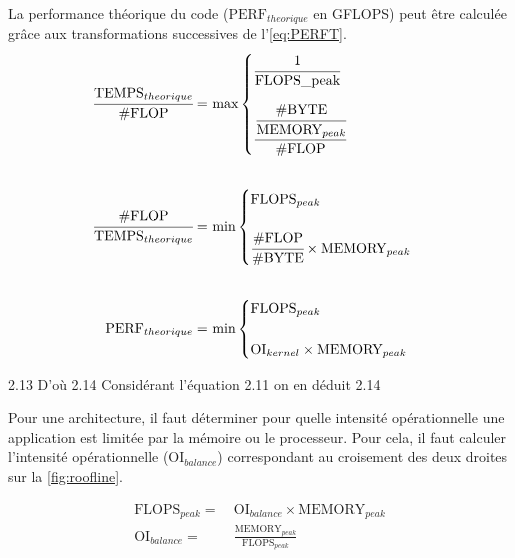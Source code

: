             
            
            
            La performance théorique du code ($\text{PERF}_{theorique}$ en GFLOPS) peut être calculée grâce aux transformations successives de l'\autoref{eq:PERFT}.
            \begin{equation}
            \begin{aligned}
            \label{eq:PERFT}
            \cfrac{\text{TEMPS}_{theorique}}{\text{\#FLOP}}  =\ &\text{max}
            \begin{cases} 
                \cfrac {1}{\text{FLOPS\_{peak}}}    \\[15pt]  
                \cfrac {\cfrac{\text{\#BYTE}}{\text{MEMORY}_{peak}}}{\text{\#FLOP}} 
            \end{cases}\\[20pt]
            \cfrac{\text{\#FLOP}}{\text{TEMPS}_{theorique}}  =\ &\text{min}
            \begin{cases} 
                \text{FLOPS}_{peak}    \\[15pt]  
                \cfrac{\text{\#FLOP}}{\text{\#BYTE}} \times \text{MEMORY}_{peak}
            \end{cases}\\[20pt]
            \text{PERF}_{theorique}  =\ &\text{min}
            \begin{cases} 
                \text{FLOPS}_{peak}    \\[15pt]  
                \text{OI}_{kernel} \times \text{MEMORY}_{peak} 
            \end{cases}
            \end{aligned}
            \end{equation}
            
            2.13
                D'où
            2.14
                Considérant l'équation 2.11 on en déduit
            2.14
                
            Pour une architecture, il faut déterminer pour quelle intensité opérationnelle une application est limitée par la mémoire ou le processeur. Pour cela, il faut calculer l’intensité opérationnelle ($\text{OI}_{balance}$) correspondant au croisement des deux droites sur la \autoref{fig:roofline}. 
            
            \begin{equation}
            \begin{aligned}
             \text{FLOPS}_{peak} =\ &\text{OI}_{balance} \times \text{MEMORY}_{peak} \\[20pt]
             \text{OI}_{balance} =\ &\frac{\text{MEMORY}_{peak}} {\text{FLOPS}_{peak}} 
            \end{aligned}
            \end{equation}
            
